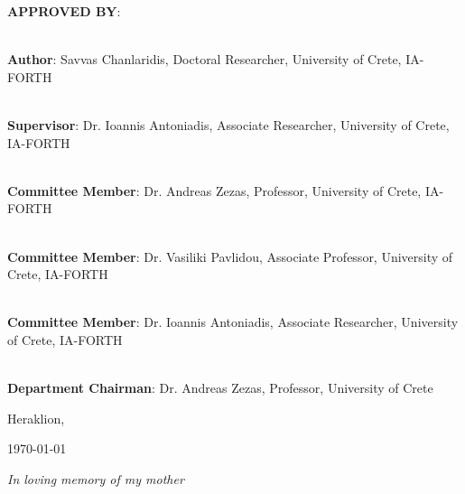 \documentclass[a4paper, 10pt, twoside]{book}
\newenvironment{dedication}
  {\clearpage
   \thispagestyle{empty}
   \vspace*{\stretch{1}}
   \itshape
   \raggedleft}
  {\par
   \vspace{\stretch{3}}
   \clearpage}
\begin{document}
    \noindent \textbf{APPROVED BY}:\\
    \vspace*{1.5cm}
    
    \noindent\hrulefill \\
    \noindent\textbf{Author}: Savvas Chanlaridis, Doctoral Researcher, University of Crete, IA-FORTH \\
    \vspace*{1cm}
    
    \noindent\hrulefill \\
    \noindent\textbf{Supervisor}: Dr. Ioannis Antoniadis, Associate Researcher, University of Crete, IA-FORTH \\
    \vspace*{1cm}    
    
    \noindent\hrulefill \\
    \noindent\textbf{Committee Member}: Dr. Andreas Zezas, Professor, University of Crete, IA-FORTH \\
    \vspace*{1cm}    
    
    \noindent\hrulefill \\
    \noindent\textbf{Committee Member}: Dr. Vasiliki Pavlidou, Associate Professor, University of Crete, IA-FORTH \\
    \vspace*{1cm}    
    
    \noindent\hrulefill \\
    \noindent\textbf{Committee Member}: Dr. Ioannis Antoniadis, Associate Researcher, University of Crete, IA-FORTH \\
    \vspace*{1cm}    
    
    \noindent\hrulefill \\
    \noindent\textbf{Department Chairman}: Dr. Andreas Zezas, Professor, University of Crete \\
    \vspace*{1cm}  
    
    \begin{center}
        \vspace*{\fill}
        Heraklion, \date{}{\today}
    \end{center}

    \newpage  %
    \mbox{}
    \thispagestyle{empty}

    \begin{dedication}
        In loving memory of my mother
    \end{dedication}
\end{document}
